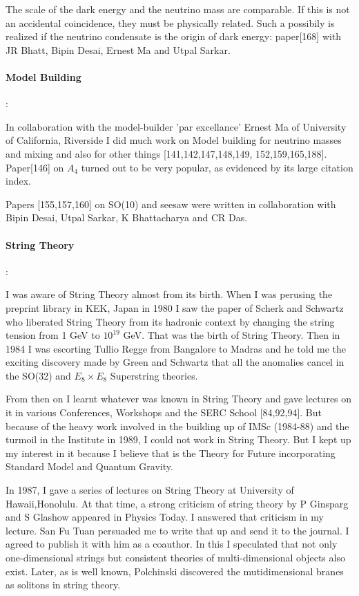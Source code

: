 The scale of the dark energy and the neutrino mass are comparable. If 
this is not an accidental coincidence, they must be physically related. 
Such a possibily is realized if the neutrino condensate is the origin of 
dark energy: paper[168] with JR Bhatt, Bipin Desai, Ernest Ma and Utpal 
Sarkar.

\paragraph{Model Building}:

In collaboration with the model-builder 'par excellance' Ernest Ma of 
University of California, Riverside I did much work on Model building 
for neutrino masses and mixing and also for other things 
[141,142,147,148,149, 152,159,165,188]. Paper[146] on $A_4$ turned out to 
be very popular, as evidenced by its large citation index.

Papers [155,157,160] on SO(10) and seesaw were written in collaboration 
with Bipin Desai, Utpal Sarkar, K Bhattacharya and CR Das.

\paragraph{String Theory}:

I was aware of String Theory almost from its birth. When I was perusing 
the preprint library in KEK, Japan in 1980 I saw the paper of Scherk and 
Schwartz who liberated String Theory from its hadronic context by 
changing the string tension from 1 GeV to $10^{19}$ GeV. That was the birth 
of String Theory. Then in 1984 I was escorting Tullio Regge from 
Bangalore to Madras and he told me the exciting discovery made by Green 
and Schwartz that all the anomalies cancel in the SO(32) and $E_8 \times E_8$ 
Superstring theories.

From then on I learnt whatever was known in String Theory and gave 
lectures on it in various Conferences, Workshops and the SERC School 
[84,92,94]. But because of the heavy work involved in the building up of 
IMSc (1984-88) and the turmoil in the Institute in 1989, I could not 
work in String Theory. But I kept up my interest in it because I believe 
that is the Theory for Future incorporating Standard Model and Quantum 
Gravity.

In 1987, I gave a series of lectures on String Theory at University of 
Hawaii,Honolulu. At that time, a strong criticism of string theory by P 
Ginsparg and S Glashow appeared in Physics Today. I answered that 
criticism in my lecture. San Fu Tuan persuaded me to write that up and 
send it to the journal. I agreed to publish it with him as a coauthor. 
In this I speculated that not only one-dimensional strings but 
consistent theories of multi-dimensional objects also exist. Later, as 
is well known, Polchinski discovered the mutidimensional branes as 
solitons in string theory.

